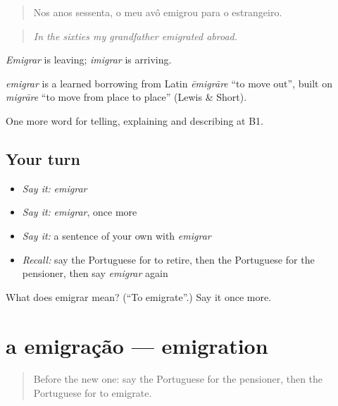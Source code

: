 \begin{quote}
Nos anos sessenta, o meu avô emigrou para o estrangeiro.
\end{quote}

\begin{quote}
\emph{In the sixties my grandfather emigrated abroad.}
\end{quote}

\emph{Emigrar} is leaving; \emph{imigrar} is arriving.

\begin{cousinweb}
\emph{emigrar} is a learned borrowing from Latin \emph{ēmigrāre} \textquotedblleft{}to move out\textquotedblright{}, built on \emph{migrāre} \textquotedblleft{}to move from place to place\textquotedblright{} (Lewis \& Short).
\end{cousinweb}

\begin{grammarlens}[title={What you've built}]
One more word for telling, explaining and describing at B1.
\end{grammarlens}

\subsection*{Your turn}
\begin{itemize}
\raggedright
  \item \emph{Say it:} \emph{emigrar}
  \item \emph{Say it:} \emph{emigrar}, once more
  \item \emph{Say it:} a sentence of your own with \emph{emigrar}
  \item \emph{Recall:} say the Portuguese for to retire, then the Portuguese for the pensioner, then say \emph{emigrar} again
\end{itemize}

\begin{tcolorbox}[breakable,colback=teal!4,colframe=teal!35!black,title={Before you move on}]
What does emigrar mean? (\textquotedblleft{}To emigrate\textquotedblright{}.) Say it once more.
\end{tcolorbox}
\section[a emigração]{a emigração — emigration}

\label{lesson:PT-C317-emigracao}



\begin{quote}
Before the new one: say the Portuguese for the pensioner, then the Portuguese for to emigrate.
\end{quote}


